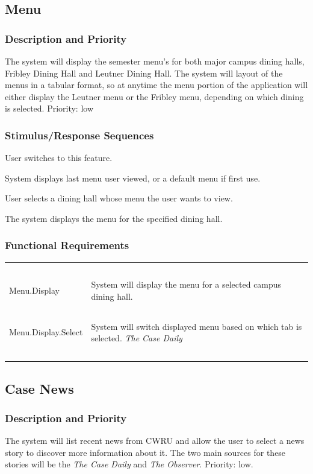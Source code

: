 \documentclass[pdftex,12pt,letter]{article}
\begin{document}
\subsection{Menu}
\subsubsection{Description and Priority}
The system will display the semester menu's for both major campus dining halls, Fribley Dining Hall and Leutner Dining Hall. The system will layout of the menus in a tabular format, so at anytime the menu portion of the application will either display the Leutner menu or the Fribley menu, depending on which dining is selected. Priority: low
\subsubsection{Stimulus/Response Sequences}
\begin{description}\itemsep1pt
\item[Stimulus:] User switches to this feature.
\item[Response:] System displays last menu user viewed, or a default menu if first use.
\item[Stimulus:] User selects a dining hall whose menu the user wants to view.
\item[Response:] The system displays the menu for the specified dining hall.
\end{description}
\subsubsection{Functional Requirements}
\begin{table}[!h]
\begin{tabularx}{\textwidth }[t]{|l Y|}
\hline
~&~\\
Menu.Display & System will display the menu for a selected campus dining hall.\\ 
~&~\\
Menu.Display.Select & System will switch displayed menu based on which tab is selected. \emph{The Case Daily}\\
~&~\\
\hline
\end{tabularx}
\end{table}
\FloatBarrier
\subsection{Case News}
\subsubsection{Description and Priority}
The system will list recent news from CWRU and allow the user to select a news story to discover more information about it. The two main sources for these stories will be the \emph{The Case Daily} and \emph{The Observer}. Priority: low.
\end{document}
